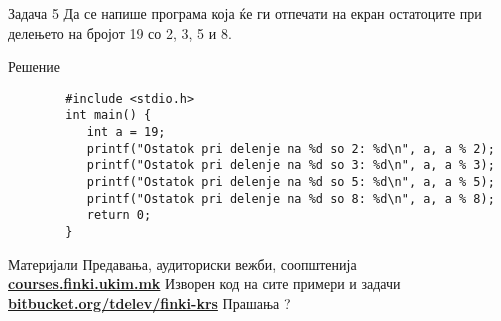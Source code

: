 \begin{frame}[fragile]{Задача 5}
Да се напише програма која ќе ги отпечати на екран остатоците при делењето на бројот 19 со 2, 3, 5 и 8.
	\begin{exampleblock}{Решение}
		\begin{lstlisting}
		#include <stdio.h>
		int main() {
		   int a = 19;
		   printf("Ostatok pri delenje na %d so 2: %d\n", a, a % 2);
		   printf("Ostatok pri delenje na %d so 3: %d\n", a, a % 3);
		   printf("Ostatok pri delenje na %d so 5: %d\n", a, a % 5);
		   printf("Ostatok pri delenje na %d so 8: %d\n", a, a % 8);
		   return 0;
		}
		\end{lstlisting}
	\end{exampleblock}
\end{frame}

\begin{frame}{Материјали}{}
	Предавања, аудиториски вежби, соопштенија\\
	\href{http://courses.finki.ukim.mk/}{\textbf{courses.finki.ukim.mk}}
	\vfill
	Изворен код на сите примери и задачи\\
	\href{http://bitbucket.org/tdelev/finki-krs/}{\textbf{bitbucket.org/tdelev/finki-krs}}
	\vfill
	{\Huge Прашања ?}
\end{frame}


